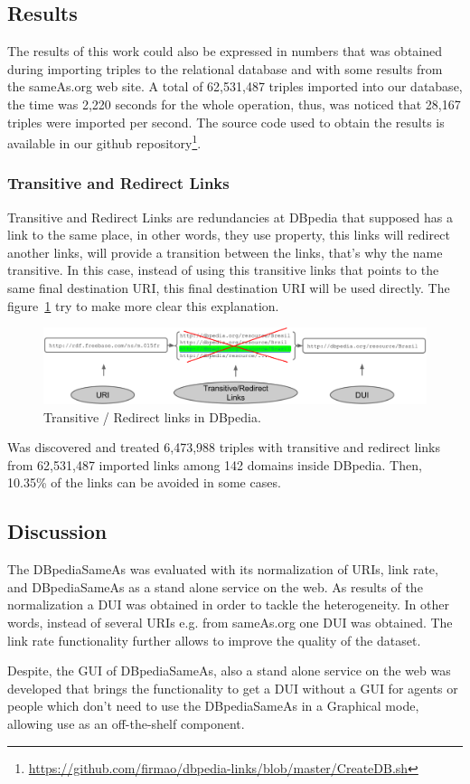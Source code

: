 \subsection{Results}
The results of this work could also be expressed in numbers that was obtained during importing triples to the relational database and with some results from the sameAs.org web site.
A total of 62,531,487 triples imported into our database, the time was 2,220 seconds for the whole operation, thus, was noticed that 28,167 triples were imported per second.
The source code used to obtain the results is available in our github repository\footnote{\url{https://github.com/firmao/dbpedia-links/blob/master/CreateDB.sh}}.

\subsubsection{Transitive and Redirect Links}
Transitive and Redirect Links are redundancies at DBpedia that supposed has a link to the same place, in other words, they use  property, this links will redirect another links, will provide a transition between the links, that's why the name transitive.
In this case, instead of using this transitive links that points to the same final destination URI, this final destination URI will be used directly. The figure~\ref{fig:transient} try to make more clear this explanation.

\begin{figure}[hbt] 
  	\centering
	\includegraphics[width=\textwidth]{img/transient.png}
  	\caption{Transitive / Redirect links in DBpedia.}
  	\label{fig:transient}
\end{figure}

Was discovered and treated 6,473,988 triples with transitive and redirect links from 62,531,487 imported links among 142 domains inside DBpedia. Then, 10.35\% of the links can be avoided in some cases. 

\subsection{Discussion}
The DBpediaSameAs was evaluated with its normalization of URIs, link rate, and DBpediaSameAs as a stand alone service on the web.
As results of the normalization a DUI was obtained in order to tackle the heterogeneity. In other words, instead of several URIs  e.g. from sameAs.org one DUI was obtained.
The link rate functionality further allows to improve the quality of the dataset.

Despite, the GUI of DBpediaSameAs, also a stand alone service on the web was developed that brings the functionality to get a DUI without a GUI for agents or people which don't need to use the DBpediaSameAs in a Graphical mode, allowing use as an off-the-shelf component.

